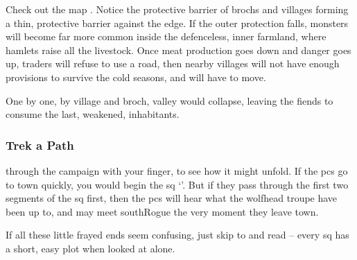 \begin{multicols}{2}
Check out the map .
Notice the protective barrier of \glspl{broch} and \glspl{village} forming a thin, protective barrier against the \gls{edge}.
If the outer protection falls, \glspl{monster} will become far more common inside the defenceless, inner farmland, where hamlets raise all the livestock.
Once meat production goes down and danger goes up, traders will refuse to use a road, then nearby \glspl{village} will not have enough provisions to survive the cold seasons, and will have to move.

One by one, by \gls{village} and \gls{broch}, \gls{valley} would collapse, leaving the \glspl{fiend} to consume the last, weakened, inhabitants.

\subsubsection{Trek a Path}
through the \gls{campaign} with your finger, to see how it might unfold.
If the \glspl{pc} go to town quickly, you would begin the \gls{sq} `'.
But if they pass through the first two \glspl{segment} of the  \gls{sq} first, then the \glspl{pc} will hear what the \gls{wolfhead} troupe have been up to, and may meet \gls{southRogue} the very moment they leave \gls{town}.

If all these little frayed ends seem confusing, just skip to  and read  -- every \gls{sq} has a short, easy plot when looked at alone.





\renewcommand\csComments{
  \mapCircle{16}{76}{1.7}{Dyson_Logos/bandit_camp}
  \mapCircle{35}{88}{2}{Dyson_Logos/forgotten_city}
  \mapCircle{27}{09}{2}{Dyson_Logos/qualme_temple}
  \mapCircle[4]{56}{52}{2.5}{Dyson_Logos/town}
  \mapCircle{44}{41}{2}{Dyson_Logos/redfall}
  \mapCircle{83}{09}{1.7}{Dyson_Logos/shadow_gate}
  \mapCircle{86}{45}{1.7}{Dyson_Logos/lochside}
  \draw[very thick,white] (11,0.6) -- (12,0.6) node[anchor=north]{\outline{10 Miles}} -- (13,0.6) ;
}



\end{multicols}

